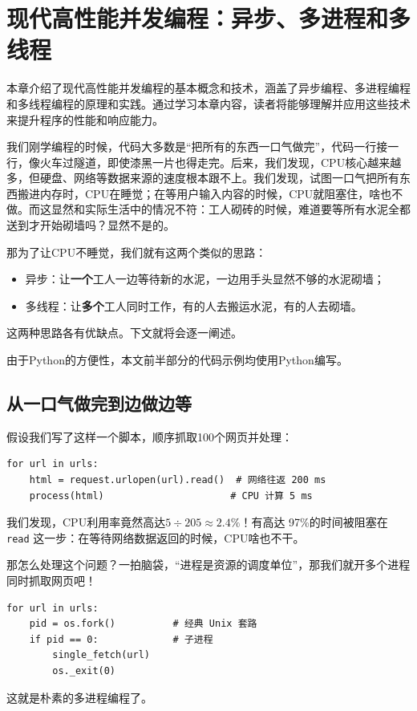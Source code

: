 \chapter{现代高性能并发编程：异步、多进程和多线程}\label{chap:multitask}

本章介绍了现代高性能并发编程的基本概念和技术，涵盖了异步编程、多进程编程和多线程编程的原理和实践。通过学习本章内容，读者将能够理解并应用这些技术来提升程序的性能和响应能力。

我们刚学编程的时候，代码大多数是“把所有的东西一口气做完”，代码一行接一行，像火车过隧道，即使漆黑一片也得走完。后来，我们发现，CPU核心越来越多，但硬盘、网络等数据来源的速度根本跟不上。我们发现，试图一口气把所有东西搬进内存时，CPU在睡觉；在等用户输入内容的时候，CPU就阻塞住，啥也不做。而这显然和实际生活中的情况不符：工人砌砖的时候，难道要等所有水泥全都送到才开始砌墙吗？显然不是的。

那为了让CPU不睡觉，我们就有这两个类似的思路：
\begin{itemize}
    \item 异步：让\textbf{一个}工人一边等待新的水泥，一边用手头显然不够的水泥砌墙；
    \item 多线程：让\textbf{多个}工人同时工作，有的人去搬运水泥，有的人去砌墙。
\end{itemize}

这两种思路各有优缺点。下文就将会逐一阐述。

由于Python的方便性，本文前半部分的代码示例均使用Python编写。

\section{从一口气做完到边做边等}

假设我们写了这样一个脚本，顺序抓取100个网页并处理：
\begin{verbatim}
for url in urls:
    html = request.urlopen(url).read()  # 网络往返 200 ms
    process(html)                      # CPU 计算 5 ms
\end{verbatim}
我们发现，CPU利用率竟然高达$ 5 \div 205 \approx 2.4 \% $！有高达 97\%的时间被阻塞在 \texttt{read} 这一步：在等待网络数据返回的时候，CPU啥也不干。

那怎么处理这个问题？一拍脑袋，“进程是资源的调度单位”，那我们就开多个进程同时抓取网页吧！
\begin{verbatim}
for url in urls:
    pid = os.fork()          # 经典 Unix 套路
    if pid == 0:             # 子进程
        single_fetch(url)
        os._exit(0)
\end{verbatim}
这就是朴素的多进程编程了。

